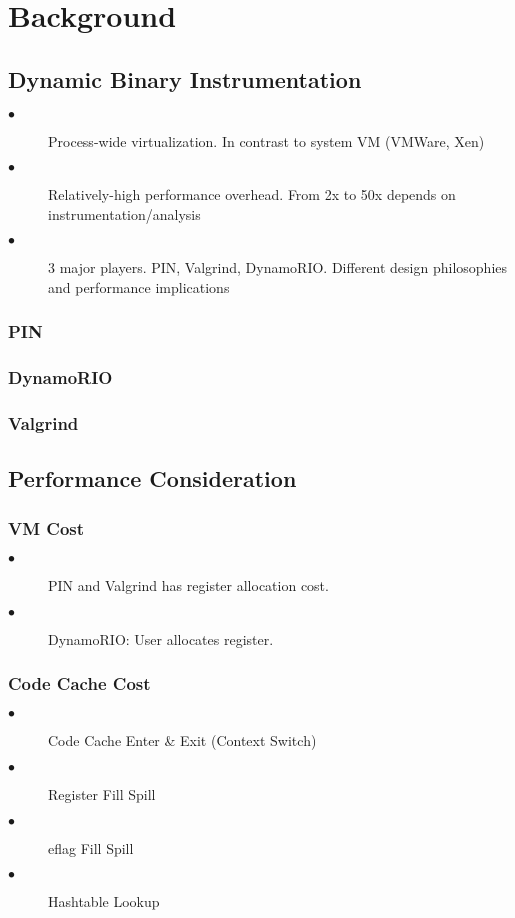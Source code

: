 
\section{Background}
\label{sec:background}
\subsection{Dynamic Binary Instrumentation}
\begin{description}
  \item[$\bullet$] Process-wide virtualization. In contrast to system VM (VMWare, Xen)
  \item[$\bullet$] Relatively-high performance overhead. From 2x to 50x depends on instrumentation/analysis
  \item[$\bullet$] 3 major players. PIN, Valgrind, DynamoRIO. Different design philosophies and performance implications
\end{description}
\subsubsection{PIN}
\subsubsection{DynamoRIO}
\subsubsection{Valgrind}
\subsection{Performance Consideration}
\subsubsection{VM Cost}
\begin{description}
  \item[$\bullet$] PIN and Valgrind has register allocation cost.
  \item[$\bullet$] DynamoRIO: User allocates register.
\end{description}
\subsubsection{Code Cache Cost}
\begin{description}
  \item[$\bullet$] Code Cache Enter \& Exit (Context Switch)
  \item[$\bullet$] Register Fill Spill
  \item[$\bullet$] eflag Fill Spill
  \item[$\bullet$] Hashtable Lookup
\end{description}
